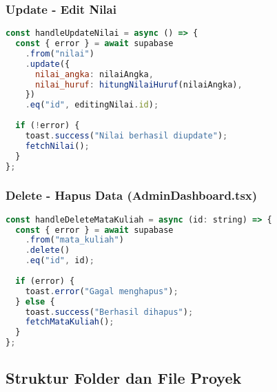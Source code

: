 \documentclass[12pt,a4paper]{article}
\begin{document}
\subsubsection{Update - Edit Nilai}

\begin{lstlisting}[language=JavaScript]
const handleUpdateNilai = async () => {
  const { error } = await supabase
    .from("nilai")
    .update({
      nilai_angka: nilaiAngka,
      nilai_huruf: hitungNilaiHuruf(nilaiAngka),
    })
    .eq("id", editingNilai.id);
    
  if (!error) {
    toast.success("Nilai berhasil diupdate");
    fetchNilai();
  }
};
\end{lstlisting}

\subsubsection{Delete - Hapus Data (AdminDashboard.tsx)}

\begin{lstlisting}[language=JavaScript]
const handleDeleteMataKuliah = async (id: string) => {
  const { error } = await supabase
    .from("mata_kuliah")
    .delete()
    .eq("id", id);
    
  if (error) {
    toast.error("Gagal menghapus");
  } else {
    toast.success("Berhasil dihapus");
    fetchMataKuliah();
  }
};
\end{lstlisting}

\subsection{Struktur Folder dan File Proyek}
\end{document}
